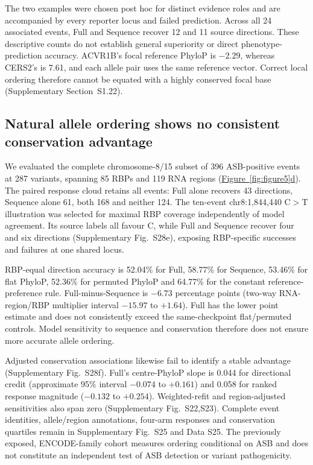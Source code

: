 \documentclass[webpdf,contemporary,large]{oup-authoring-template}
\newcommand{\figpanelref}[2]{\hyperref[#1]{Figure~\ref*{#1}#2}}
\newcommand{\supfig}[1]{Supplementary Fig.~#1}
\newcommand{\supsect}[1]{Supplementary Section~#1}
\begin{document}
The two examples were chosen post hoc for distinct evidence roles and are accompanied by every reporter locus and failed prediction. Across all 24 associated events, Full and Sequence recover 12 and 11 source directions. These descriptive counts do not establish general superiority or direct phenotype-prediction accuracy. ACVR1B's focal reference PhyloP is $-2.29$, whereas CERS2's is 7.61, and each allele pair uses the same reference vector. Correct local ordering therefore cannot be equated with a highly conserved focal base (\supsect{S1.22}).

\subsection{Natural allele ordering shows no consistent conservation advantage}\label{subsec:natural_variants}

We evaluated the complete chromosome-8/15 subset of 396 ASB-positive events at 287 variants, spanning 85 RBPs and 119 RNA regions (\figpanelref{fig:figure5}{d}). The paired response cloud retains all events: Full alone recovers 43 directions, Sequence alone 61, both 168 and neither 124. The ten-event chr8:1,844,440 C$>$T illustration was selected for maximal RBP coverage independently of model agreement. Its source labels all favour C, while Full and Sequence recover four and six directions (\supfig{S28e}), exposing RBP-specific successes and failures at one shared locus.

RBP-equal direction accuracy is 52.04\% for Full, 58.77\% for Sequence, 53.46\% for flat PhyloP, 52.36\% for permuted PhyloP and 64.77\% for the constant reference-preference rule. Full-minus-Sequence is $-6.73$ percentage points (two-way RNA-region/RBP multiplier interval $-15.97$ to $+1.64$). Full has the lower point estimate and does not consistently exceed the same-checkpoint flat/permuted controls. Model sensitivity to sequence and conservation therefore does not ensure more accurate allele ordering.

Adjusted conservation associations likewise fail to identify a stable advantage (\supfig{S28f}). Full's centre-PhyloP slope is 0.044 for directional credit (approximate 95\% interval $-0.074$ to $+0.161$) and 0.058 for ranked response magnitude ($-0.132$ to $+0.254$). Weighted-refit and region-adjusted sensitivities also span zero (\supfig{S22,S23}). Complete event identities, allele/region annotations, four-arm responses and conservation quartiles remain in \supfig{S25} and Data S25. The previously exposed, ENCODE-family cohort measures ordering conditional on ASB and does not constitute an independent test of ASB detection or variant pathogenicity.
\end{document}
